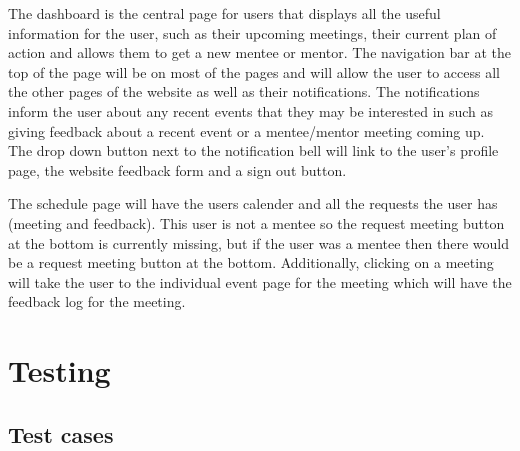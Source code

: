 \documentclass[10pt]{article}
\begin{document}
The dashboard is the central page for users that displays all the useful
information for the user, such as their upcoming meetings, their current plan of
action and allows them to get a new mentee or mentor. The navigation bar at the
top of the page will be on most of the pages and will allow the user to access
all the other pages of the website as well as their notifications. The
notifications inform the user about any recent events that they may be
interested in such as giving feedback about a recent event or a mentee/mentor
meeting coming up. The drop down button next to the notification bell will link
to the user's profile page, the website feedback form and a sign out button.

The schedule page will have the users calender and all the requests the user has
(meeting and feedback). This user is not a mentee so the request meeting button
at the bottom is currently missing, but if the user was a mentee then there
would be a request meeting button at the bottom. Additionally, clicking on a
meeting will take the user to the individual event page for the meeting which
will have the feedback log for the meeting.



\section{Testing}
\subsection{Test cases}
\end{document}
